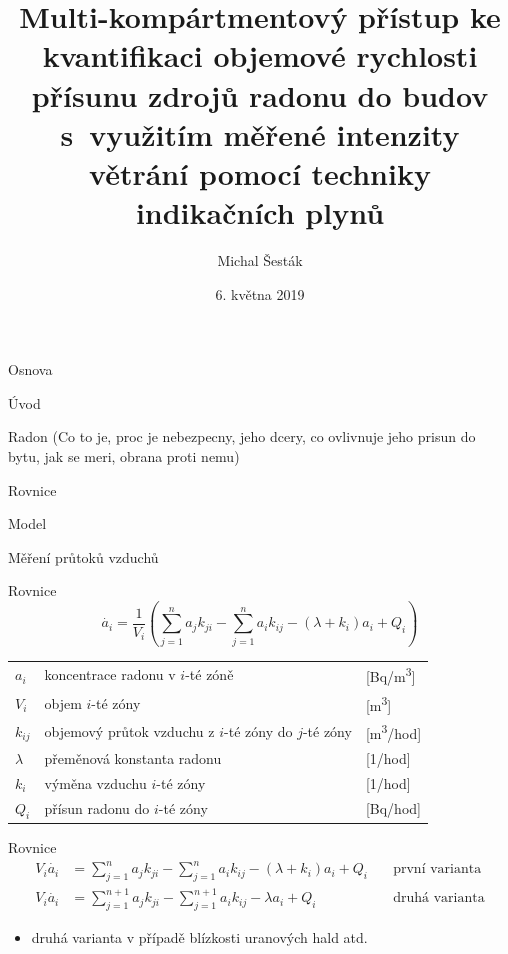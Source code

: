 \documentclass[10pt]{beamer}
\author{Michal Šesták}
\title{Multi-kompártmentový přístup ke kvantifikaci  objemové rychlosti přísunu zdrojů radonu do budov s využitím měřené intenzity větrání pomocí techniky indikačních plynů}
\subtitle{}
\institute{}
\date{6. května 2019}
\begin{document}
\maketitle

\begin{frame}{Osnova}
\item Úvod
\item Radon (Co to je, proc je nebezpecny, jeho dcery, co ovlivnuje jeho prisun do bytu, jak se meri, obrana proti nemu)
\item Rovnice
\item Model
\item Měření průtoků vzduchů
\end{frame}

\begin{frame}{Rovnice}
    \small
    \begin{equation}
        \dot{a_i}=\frac{1}{V_i}\left( \sum^n_{j=1}a_j k_{ji}-\sum^n_{j=1}a_i k_{ij}-(\lambda+k_i)a_i+Q_i \right)
        \label{eq:odvozovani}
    \end{equation}
    \begin{table}
        \centering
        \begin{tabular}{lll}
            $a_i$ & koncentrace radonu v $i$-té zóně& [\si{Bq/m^3}] \\
            $V_i$ & objem $i$-té zóny& [\si{m^3}] \\
            $k_{ij}$ & objemový průtok vzduchu z $i$-té zóny do $j$-té zóny& [\si{m^3/hod}]\\
            $\lambda$ & přeměnová konstanta radonu& [\si{1/hod}]\\
            $k_i$ & výměna vzduchu $i$-té zóny& [\si{1/hod}] \\
            $Q_i$ & přísun radonu do $i$-té zóny& [\si{Bq/hod}] \\
        \end{tabular}
    \end{table}
\end{frame}

\begin{frame}{Rovnice}
    \small
    \begin{align}
        V_i\dot{a_i}&=\sum^n_{j=1}a_j k_{ji}-\sum^n_{j=1}a_i k_{ij}-(\lambda+k_i)a_i+Q_i\quad&\text{první varianta}\\
        V_i\dot{a_i}&=\sum^{n+1}_{j=1}a_j k_{ji}-\sum^{n+1}_{j=1}a_i k_{ij}-\lambda a_i+Q_i\quad&\text{druhá varianta}
        \label{eq:rovnice}
    \end{align}
    \begin{itemize}
        \item druhá varianta v případě blízkosti uranových hald atd.
    \end{itemize}
\end{frame}
\end{document}
